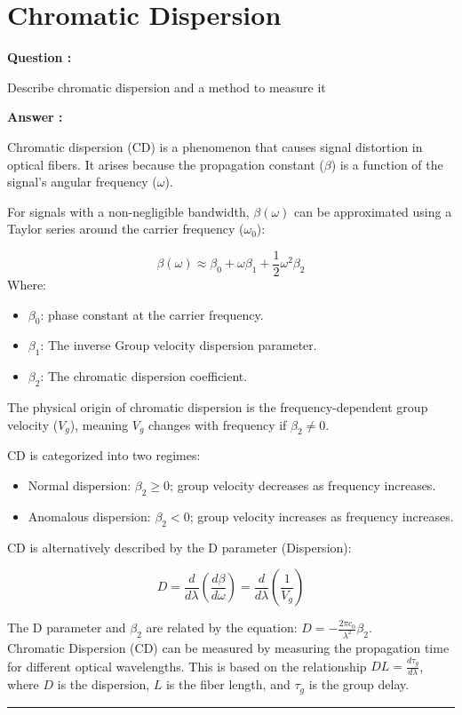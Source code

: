 \documentclass[a4paper,11pt]{book}
\newcounter{qacount}
\newenvironment{question}{
  \refstepcounter{qacount}
  \vspace{1em} %
  \noindent\textbf{Question \theqacount:}\space
}{
  \par %
}
\newenvironment{answer}{
  \noindent\textbf{Answer \theqacount:}\space
}{
  \par\vspace{1em}   %
  \hrule             %
  \vspace{0.5em}     %
}
\begin{document}
\chapter*{Chromatic Dispersion}
\begin{question}
    Describe chromatic dispersion and a method to measure it
\end{question}

\begin{answer}
    Chromatic dispersion (CD) is a phenomenon that causes signal distortion in optical fibers. It arises because the propagation constant ($\beta$) is a function of the signal's angular frequency ($\omega$).

    For signals with a non-negligible bandwidth, $\beta(\omega)$ can be approximated using a Taylor series around the carrier frequency ($\omega_0$):

    $$\beta(\omega) \approx \beta_0 + \omega\beta_1 + \frac{1}{2}\omega^2\beta_2$$
    Where:
    \begin{itemize}
        \item $\beta_0$: phase constant at the carrier frequency.
        \item $\beta_1$: The inverse Group velocity dispersion parameter.
        \item $\beta_2$: The chromatic dispersion coefficient.
    \end{itemize}

    The physical origin of chromatic dispersion is the frequency-dependent group velocity ($V_g$), meaning $V_g$ changes with frequency if $\beta_2 \neq 0$.

    CD is categorized into two regimes:
    \begin{itemize}
        \item Normal dispersion: $\beta_2 \geq 0$; group velocity decreases as frequency increases.
        \item Anomalous dispersion: $\beta_2 < 0$; group velocity increases as frequency increases.
    \end{itemize}
    CD is alternatively described by the D parameter (Dispersion):

    $$D = \frac{d}{d\lambda}\left(\frac{d\beta}{d\omega}\right) = \frac{d}{d\lambda}\left(\frac{1}{V_g}\right)$$

    The D parameter and $\beta_2$ are related by the equation: $D = -\frac{2\pi c_0}{\lambda^2}\beta_2$.\\
    Chromatic Dispersion (CD) can be measured by measuring the propagation time for different optical wavelengths. This is based on the relationship $D L = \frac{d\tau_g}{d\lambda}$, where $D$ is the dispersion, $L$ is the fiber length, and $\tau_g$ is the group delay.
\end{answer}
\end{document}
